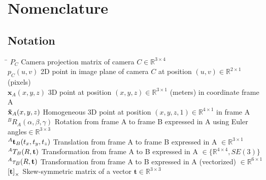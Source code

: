 \begin{abstract}
\lipsum[1-3]
\end{abstract}

\chapter*{Nomenclature}\label{ch:symbols}

\section*{Notation}
\label{sec:notation}

\begin{tabbing}
	\hspace*{3.0cm}		\= \kill
	$P_C$ \> Camera projection matrix of camera $C \in \mathbb{R}^{3\times4}$ \\[0.75ex]
	$p_C(u,v)$ \> 2D point in image plane of camera $C$ at position $(u,v) \in \mathbb{R}^{2\times1}$ (pixels) \\[0.75ex]
	$\mathbf{x}_A(x,y,z)$ \> 3D point at position $(x,y,z) \in \mathbb{R}^{3\times1}$ (meters) in coordinate frame A \\[0.75ex]
	$\mathbf{\tilde{x}}_A(x,y,z)$ \> Homogeneous 3D point at position $(x,y,z,1) \in \mathbb{R}^{4\times1}$ in frame A \\[0.75ex]
	$^BR_{A}(\alpha, \beta, \gamma)$ \> Rotation from frame A to frame B expressed in A using Euler angles$\in \mathbb{R}^{3\times3}$ \\[0.75ex]
	$^A\mathbf{t}_{B}(t_x,t_y,t_z)$ \> Translation from frame A to frame B expressed in A $\in \mathbb{R}^{3\times1}$ \\[0.75ex]
	$^{A}T_{B}(R,\mathbf{t})$ \> Transformation from frame A to B expressed in A $\in \{\mathbb{R}^{4\times4},SE(3)\}$ \\[0.75ex]
	$\t2v{A}{B}(R,\trans)$ \> Transformation from frame A to B expressed in A (vectorized) $\in \mathbb{R}^{6\times1}$ \\[0.75ex]
	${\left[\mathbf{t}\right]}_\times$ \> Skew-symmetric matrix of a vector $\mathbf{t} \in \mathbb{R}^{3\times3}$
\end{tabbing}

